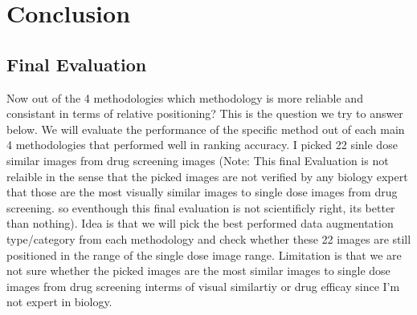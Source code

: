 \chapter{Conclusion}

\section{Final Evaluation}
Now out of the 4 methodologies which methodology is more reliable and consistant in terms of relative positioning? This is the question we try to answer below.
We will evaluate the performance of the specific method out of each main 4 methodologies that performed well in ranking accuracy.
I picked 22 sinle dose  similar images from drug screening images (Note: This final Evaluation is not relaible in the sense that the picked images are not verified by any biology expert that those are the most visually similar images to single dose images from drug screening. so eventhough this final evaluation is not scientificly right, its better than nothing). Idea is that we will pick the best performed data augmentation type/category from each methodology and check whether these 22 images are still positioned in the range of the single dose image range. Limitation is that we are not sure whether the picked images are the most similar images to single dose images from drug screening interms of visual similartiy or drug efficay since I'm not expert in biology.

